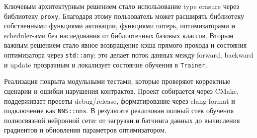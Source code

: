 \documentclass{article}
\begin{document}
Ключевым архитектурным решением стало использование type erasure через
библиотеку \texttt{proxy}. Благодаря этому пользователь может
расширять библиотеку собственными функциями активации, функциями
потерь, оптимизаторами и scheduler-ами без наследования от
библиотечных базовых классов. Вторым важным решением стало явное
возвращение кэша прямого прохода и состояния оптимизатора через
\texttt{std::any}; это делает поток данных между forward, backward и
update прозрачным и локализует состояние обучения в \texttt{Trainer}.

Реализация покрыта модульными тестами, которые проверяют корректные
сценарии и ошибки нарушения контрактов. Проект собирается через CMake,
поддерживает пресеты debug/release, форматирование через clang-format
и подключение как \texttt{NNS::nns}. В результате реализован полный
стек обучения полносвязной нейронной сети: от загрузки и батчинга
данных до вычисления градиентов и обновления параметров оптимизатором.



\end{document}
